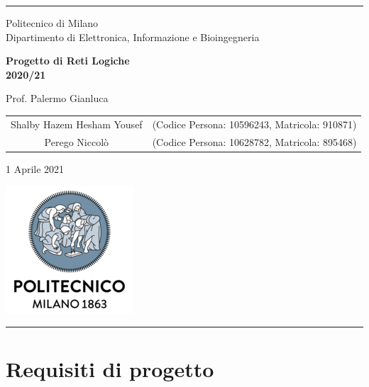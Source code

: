 \documentclass{article}
\begin{document}
\setlength\parindent{0pt} %
\setlength\parskip{1em}

\begin{titlepage}
    \centering
    \hrule

    \vspace{0,5cm}
    {
        \normalsize Politecnico di Milano\\
        Dipartimento di Elettronica, Informazione e Bioingegneria
    }

    \vspace{5cm}
    {\Huge \textbf{Progetto di Reti Logiche\\
            2020/21}\\}

    \vspace{0,5cm}
    \large {Prof. Palermo Gianluca}

    \vspace{2,5cm}
    {
        \large
        \begin{tabular}{c c}
            Shalby Hazem Hesham Yousef & (Codice Persona: 10596243, Matricola: 910871) \\
            Perego Niccolò             & (Codice Persona: 10628782, Matricola: 895468) \\
        \end{tabular}

    }

    \vspace{4cm}

    \normalsize{1 Aprile 2021}
    \vspace{0,2cm}

    \centering\hspace{0,2cm}\includegraphics[scale=0.6]{logo.png}
    \vspace{0,5cm}
    \hrule

\end{titlepage}

\pagebreak

\section{Requisiti di progetto} %
\end{document}
